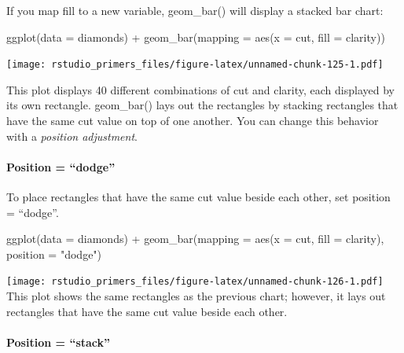 \documentclass[
]{article}
\newenvironment{Shaded}{\begin{snugshade}}{\end{snugshade}}
\newcommand{\AttributeTok}[1]{\textcolor[rgb]{0.77,0.63,0.00}{#1}}
\newcommand{\FunctionTok}[1]{\textcolor[rgb]{0.00,0.00,0.00}{#1}}
\newcommand{\NormalTok}[1]{#1}
\newcommand{\SpecialCharTok}[1]{\textcolor[rgb]{0.00,0.00,0.00}{#1}}
\newcommand{\StringTok}[1]{\textcolor[rgb]{0.31,0.60,0.02}{#1}}
\begin{document}
If you map fill to a new variable, geom\_bar() will display a stacked
bar chart:

\begin{Shaded}
\begin{Highlighting}[]
\FunctionTok{ggplot}\NormalTok{(}\AttributeTok{data =}\NormalTok{ diamonds) }\SpecialCharTok{+}
  \FunctionTok{geom\_bar}\NormalTok{(}\AttributeTok{mapping =} \FunctionTok{aes}\NormalTok{(}\AttributeTok{x =}\NormalTok{ cut, }\AttributeTok{fill =}\NormalTok{ clarity))}
\end{Highlighting}
\end{Shaded}

\texttt{[image: rstudio\_primers\_files/figure-latex/unnamed-chunk-125-1.pdf]}

This plot displays 40 different combinations of cut and clarity, each
displayed by its own rectangle. geom\_bar() lays out the rectangles by
stacking rectangles that have the same cut value on top of one another.
You can change this behavior with a \emph{position adjustment}.

\hypertarget{position-dodge}{%
\paragraph{Position = ``dodge''}\label{position-dodge}}

To place rectangles that have the same cut value beside each other, set
position = ``dodge''.

\begin{Shaded}
\begin{Highlighting}[]
\FunctionTok{ggplot}\NormalTok{(}\AttributeTok{data =}\NormalTok{ diamonds) }\SpecialCharTok{+}
  \FunctionTok{geom\_bar}\NormalTok{(}\AttributeTok{mapping =} \FunctionTok{aes}\NormalTok{(}\AttributeTok{x =}\NormalTok{ cut, }\AttributeTok{fill =}\NormalTok{ clarity), }\AttributeTok{position =} \StringTok{"dodge"}\NormalTok{)}
\end{Highlighting}
\end{Shaded}

\texttt{[image: rstudio\_primers\_files/figure-latex/unnamed-chunk-126-1.pdf]}
This plot shows the same rectangles as the previous chart; however, it
lays out rectangles that have the same cut value beside each other.

\hypertarget{position-stack}{%
\paragraph{Position = ``stack''}\label{position-stack}}
\end{document}
